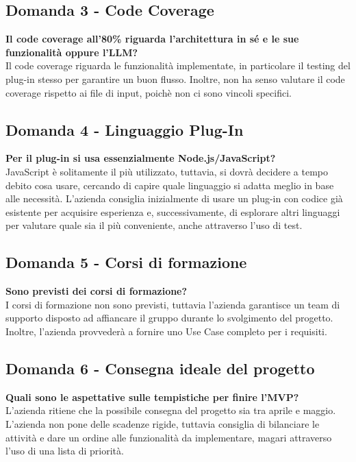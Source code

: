 \documentclass[10pt]{article}
\begin{document}
    \subsection{Domanda 3 - Code Coverage}
    \textbf{Il code coverage all'80\% riguarda l'architettura in sé e le sue funzionalità oppure l'LLM?} 
    \\
    \textnormal{Il code coverage riguarda le funzionalità implementate, in particolare il testing del plug-in stesso per garantire un buon flusso. Inoltre, non ha senso valutare il code coverage rispetto ai file di input, poichè non ci sono vincoli specifici.} 
    
    \subsection{Domanda 4 - Linguaggio Plug-In}
    \textbf{Per il plug-in si usa essenzialmente Node.js/JavaScript?} 
    \\
    \textnormal{JavaScript è solitamente il più utilizzato, tuttavia, si dovrà decidere a tempo debito cosa usare, cercando di capire quale linguaggio si adatta meglio in base alle necessità. L'azienda consiglia inizialmente di usare un plug-in con codice già esistente per acquisire esperienza e, successivamente, di esplorare altri linguaggi per valutare quale sia il più conveniente, anche attraverso l'uso di test.} 
    
    \subsection{Domanda 5 - Corsi di formazione}
    \textbf{Sono previsti dei corsi di formazione?} 
    \\
    \textnormal{I corsi di formazione non sono previsti, tuttavia l'azienda garantisce un team di supporto disposto ad affiancare il gruppo durante lo svolgimento del progetto. Inoltre, l'azienda provvederà a fornire uno Use Case completo per i requisiti.}

    \subsection{Domanda 6 - Consegna ideale del progetto}
    \textbf{Quali sono le aspettative sulle tempistiche per finire l'MVP?} 
    \\
    \textnormal{L'azienda ritiene che la possibile consegna del progetto sia tra aprile e maggio. L'azienda non pone delle scadenze rigide, tuttavia consiglia di bilanciare le attività e dare un ordine alle funzionalità da implementare, magari attraverso l'uso di una lista di priorità.} 
\end{document}
